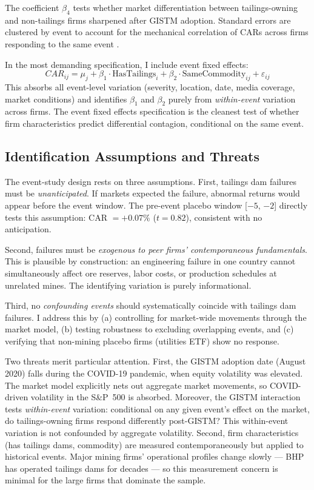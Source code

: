 \documentclass[12pt]{article}
\begin{document}
The coefficient $\beta_4$ tests whether market differentiation between tailings-owning and non-tailings firms sharpened after GISTM adoption. Standard errors are clustered by event to account for the mechanical correlation of CARs across firms responding to the same event \citep{petersen2009estimating, kolari2010event}.

In the most demanding specification, I include event fixed effects:
\begin{equation}\label{eq:event_fe}
CAR_{ij} = \mu_j + \beta_1 \cdot \text{HasTailings}_i + \beta_2 \cdot \text{SameCommodity}_{ij} + \varepsilon_{ij}
\end{equation}
This absorbs all event-level variation (severity, location, date, media coverage, market conditions) and identifies $\beta_1$ and $\beta_2$ purely from \emph{within-event} variation across firms. The event fixed effects specification is the cleanest test of whether firm characteristics predict differential contagion, conditional on the same event.

\subsection{Identification Assumptions and Threats}

The event-study design rests on three assumptions. First, tailings dam failures must be \emph{unanticipated}. If markets expected the failure, abnormal returns would appear before the event window. The pre-event placebo window [$-5$, $-2$] directly tests this assumption: CAR $= +0.07\%$ ($t = 0.82$), consistent with no anticipation.

Second, failures must be \emph{exogenous to peer firms' contemporaneous fundamentals}. This is plausible by construction: an engineering failure in one country cannot simultaneously affect ore reserves, labor costs, or production schedules at unrelated mines. The identifying variation is purely informational.

Third, no \emph{confounding events} should systematically coincide with tailings dam failures. I address this by (a) controlling for market-wide movements through the market model, (b) testing robustness to excluding overlapping events, and (c) verifying that non-mining placebo firms (utilities ETF) show no response.

Two threats merit particular attention. First, the GISTM adoption date (August 2020) falls during the COVID-19 pandemic, when equity volatility was elevated. The market model explicitly nets out aggregate market movements, so COVID-driven volatility in the S\&P~500 is absorbed. Moreover, the GISTM interaction tests \emph{within-event} variation: conditional on any given event's effect on the market, do tailings-owning firms respond differently post-GISTM? This within-event variation is not confounded by aggregate volatility. Second, firm characteristics (has tailings dams, commodity) are measured contemporaneously but applied to historical events. Major mining firms' operational profiles change slowly --- BHP has operated tailings dams for decades --- so this measurement concern is minimal for the large firms that dominate the sample.
\end{document}
